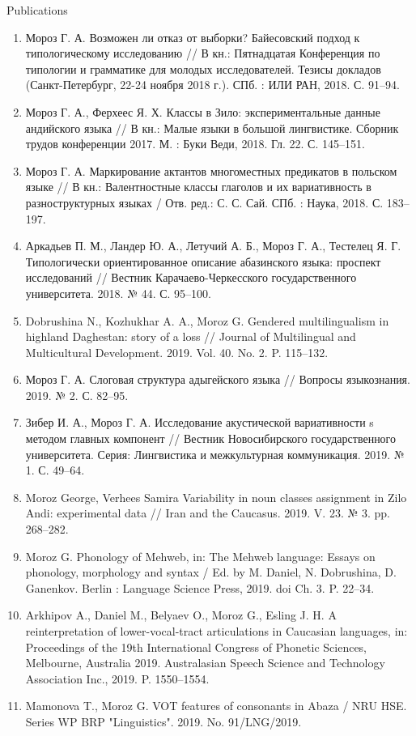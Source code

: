 \documentclass{resume} %
\begin{document}
\begin{rSection}{Publications}
\begin{enumerate}
\item Мороз Г. А. Возможен ли отказ от выборки? Байесовский подход к типологическому исследованию // В кн.: Пятнадцатая Конференция по типологии и грамматике для молодых исследователей. Тезисы докладов (Санкт-Петербург, 22-24 ноября 2018 г.). СПб. : ИЛИ РАН, 2018. С. 91--94.
\item Мороз Г. А., Ферхеес Я. Х. Классы в Зило: экспериментальные данные андийского языка // В кн.: Малые языки в большой лингвистике. Сборник трудов конференции 2017. М. : Буки Веди, 2018. Гл. 22. С. 145--151.
\item Мороз Г. А. Маркирование актантов многоместных предикатов в польском языке // В кн.: Валентностные классы глаголов и их вариативность в разноструктурных языках / Отв. ред.: С. С. Сай. СПб. : Наука, 2018. С. 183--197.
\item Аркадьев П. М., Ландер Ю. А., Летучий А. Б., Мороз Г. А., Тестелец Я. Г. Типологически ориентированное описание абазинского языка: проспект исследований // Вестник Карачаево-Черкесского государственного университета. 2018. № 44. С. 95--100.
\item  Dobrushina N., Kozhukhar A. A., Moroz G. Gendered multilingualism in highland Daghestan: story of a loss // Journal of Multilingual and Multicultural Development. 2019. Vol. 40. No. 2. P. 115--132.
\item Мороз Г. А. Слоговая структура адыгейского языка // Вопросы языкознания. 2019. № 2. С. 82--95.
\item  Зибер И. А., Мороз Г. А. Исследование акустической вариативности s методом главных компонент // Вестник Новосибирского государственного университета. Серия: Лингвистика и межкультурная коммуникация. 2019. № 1. С. 49--64.
\item Moroz George, Verhees Samira Variability in noun classes assignment in Zilo Andi: experimental data // Iran and the Caucasus. 2019. V. 23. № 3. pp. 268--282.
\item  Moroz G. Phonology of Mehweb, in: The Mehweb language: Essays on phonology, morphology and syntax / Ed. by M. Daniel, N. Dobrushina, D. Ganenkov. Berlin : Language Science Press, 2019. doi Ch. 3. P. 22--34.
\item Arkhipov A., Daniel M., Belyaev O., Moroz G., Esling J. H. A reinterpretation of lower-vocal-tract articulations in Caucasian languages, in: Proceedings of the 19th International Congress of Phonetic Sciences, Melbourne, Australia 2019. Australasian Speech Science and Technology Association Inc., 2019. P. 1550--1554.
\item Mamonova T., Moroz G. VOT features of consonants in Abaza / NRU HSE. Series WP BRP "Linguistics". 2019. No. 91/LNG/2019.

\end{enumerate}
\end{rSection}
\end{document}
